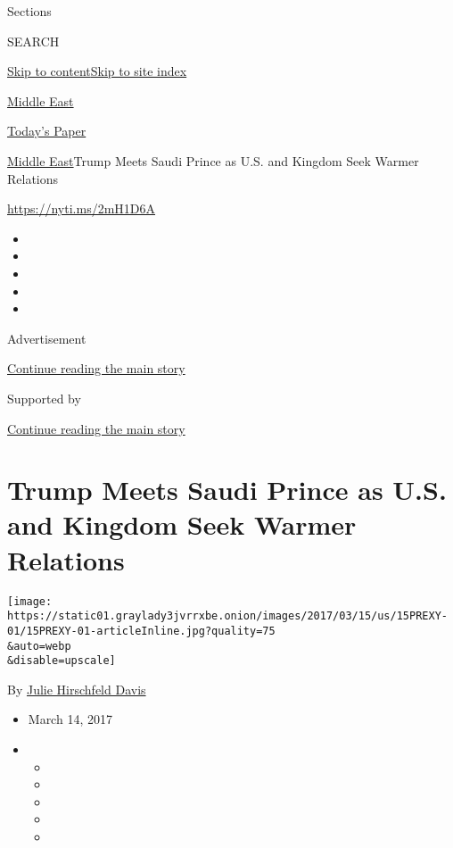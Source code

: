 Sections

SEARCH

\protect\hyperlink{site-content}{Skip to
content}\protect\hyperlink{site-index}{Skip to site index}

\href{https://www.nytimes3xbfgragh.onion/section/world/middleeast}{Middle
East}

\href{https://myaccount.nytimes3xbfgragh.onion/auth/login?response_type=cookie\&client_id=vi}{}

\href{https://www.nytimes3xbfgragh.onion/section/todayspaper}{Today's
Paper}

\href{/section/world/middleeast}{Middle East}\textbar{}Trump Meets Saudi
Prince as U.S. and Kingdom Seek Warmer Relations

\url{https://nyti.ms/2mH1D6A}

\begin{itemize}
\item
\item
\item
\item
\item
\end{itemize}

Advertisement

\protect\hyperlink{after-top}{Continue reading the main story}

Supported by

\protect\hyperlink{after-sponsor}{Continue reading the main story}

\hypertarget{trump-meets-saudi-prince-as-us-and-kingdom-seek-warmer-relations}{%
\section{Trump Meets Saudi Prince as U.S. and Kingdom Seek Warmer
Relations}\label{trump-meets-saudi-prince-as-us-and-kingdom-seek-warmer-relations}}

\texttt{[image: https://static01.graylady3jvrrxbe.onion/images/2017/03/15/us/15PREXY-01/15PREXY-01-articleInline.jpg?quality=75\\\&auto=webp\\\&disable=upscale]}

By
\href{https://www.nytimes3xbfgragh.onion/by/julie-hirschfeld-davis}{Julie
Hirschfeld Davis}

\begin{itemize}
\item
  March 14, 2017
\item
  \begin{itemize}
  \item
  \item
  \item
  \item
  \item
  \end{itemize}
\end{itemize}


